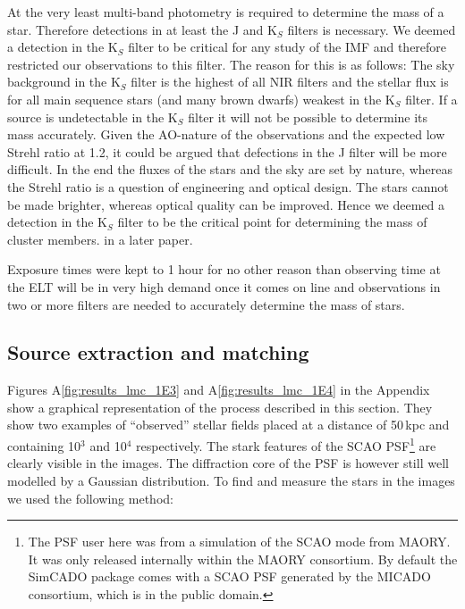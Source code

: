 At the very least multi-band photometry is required to determine the mass of
a  star. Therefore detections in at least the J and K$_S$ filters is
necessary.  We deemed a detection in the K$_S$ filter to be critical for any
study of the IMF and therefore restricted our observations to this filter.
The  reason for this is as follows: The sky background in the K$_S$ filter is
the highest of all NIR filters and the stellar flux is for all main sequence
stars (and many brown dwarfs) weakest in the K$_S$ filter. If a source is
undetectable in the K$_S$ filter it will not be possible to determine its
mass  accurately. Given the AO-nature of the observations and the expected
low  Strehl ratio at 1.2\um \citep{clenet2016}, it could be argued that
defections in the J filter will be more difficult. In the end the fluxes of
the  stars and the sky are set by nature, whereas the Strehl ratio is a
question of engineering and optical design. The stars cannot be made
brighter,  whereas optical quality can be improved. Hence we deemed a
detection  in the K$_S$ filter to be the critical point for determining the
mass  of cluster members.
in  a later paper.

Exposure times were kept to 1 hour for no other reason than observing time at
the ELT will be in very high demand once it comes on line and observations in
two or more filters are needed to accurately determine the mass of stars.


\subsection{Source extraction and matching}
Figures A\ref{fig:results_lmc_1E3} and A\ref{fig:results_lmc_1E4} in the
Appendix show a graphical representation of the process described in this
section. They show two examples of ``observed'' stellar fields placed at a
distance of 50\,kpc and containing 10$^3$ and 10$^4$ \spa respectively. The
stark features of the SCAO PSF\footnote{The PSF user here was from a
simulation  of the SCAO mode from MAORY. It was only released internally
within  the MAORY consortium. By default the SimCADO package comes with a
SCAO  PSF generated by the MICADO consortium, which is in the public domain.}
are clearly visible in the images. The diffraction core of the PSF is however
still well modelled by a Gaussian distribution. To find and measure the stars
in the images we used the following method:

